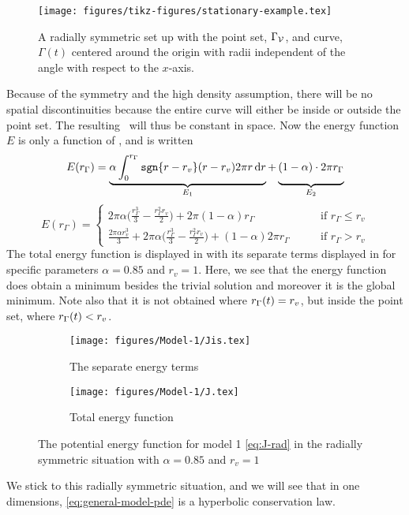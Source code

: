 \begin{figure}
    \centering
    \texttt{[image: figures/tikz-figures/stationary-example.tex]}
    \caption[One dimensional analytical example]{A radially symmetric set up with the point set, $\Gamma_{\mathcal{V}}$, and curve, $\Gamma (t)$ centered around the origin with radii independent of the angle with respect to the $x$-axis.}
    \label{fig:stationary-example}
\end{figure}
Because of the symmetry and the high density assumption, there will be no spatial discontinuities because the entire curve will either be inside or outside the point set. The resulting \sigmaxt\ will thus be constant in space. Now the energy function $E$ is only a function of \radgamma, and is written
\begin{equation*}
    E(r_{\Gamma}) = \underbrace{\alpha \int_0^{r_{\Gamma}} \texttt{sgn}\{r-r_v\} (r-r_v) 2\pi r \diff r}_\text{$E_1$} + \underbrace{(1-\alpha)\cdot 2\pi r_{\Gamma} \vphantom{ \int_0^{r_{\Gamma}}}}_\text{$E_2$}
\end{equation*}
\begin{equation}
    E(r_{\Gamma}) = \begin{cases}
        2\pi \alpha \bigg( \frac{r_{\Gamma}^3}{3}- \frac{r_{\Gamma}^2 r_v}{2} \bigg) + 2\pi (1-\alpha) r_{\Gamma} &\qquad \text{if } r_{\Gamma}\leq r_v\\
        \frac{2\pi \alpha r_v^3}{3} + 2\pi \alpha \bigg( \frac{r_{\Gamma}^3}{3}- \frac{r_{\Gamma}^2 r_v}{2} \bigg) + (1-\alpha) 2\pi r_{\Gamma} &\qquad \text{if } r_{\Gamma}>r_v
        \end{cases}
    \label{eq:J-rad}
\end{equation}
The total energy function is displayed in  with its separate terms displayed in  for specific parameters $\alpha=0.85$ and $r_v=1$. Here, we see that the energy function does obtain a minimum besides the trivial solution and moreover it is the global minimum. Note also that it is not obtained where $r_{\Gamma}(t)=r_v$, but inside the point set, where $r_{\Gamma}(t)<r_v$.

\begin{figure}
    \begin{subfigure}[b]{0.48\linewidth}
        \centering
        \texttt{[image: figures/Model-1/Jis.tex]}
        \caption{The separate energy terms}
        \label{fig:model1-j1}
    \end{subfigure}
    \begin{subfigure}[b]{0.48\linewidth}
        \centering
        \texttt{[image: figures/Model-1/J.tex]}
        \caption{Total energy function}
        \label{fig:model-jtot}
    \end{subfigure}
    \caption[Minimization problem]{The potential energy function for model 1 \eqref{eq:J-rad} in the radially symmetric situation with $\alpha=0.85$ and $r_v=1$}
    \label{fig:minimization-model1}
\end{figure}

We stick to this radially symmetric situation, and we will see that in one dimensions, \eqref{eq:general-model-pde} is a hyperbolic conservation law.


